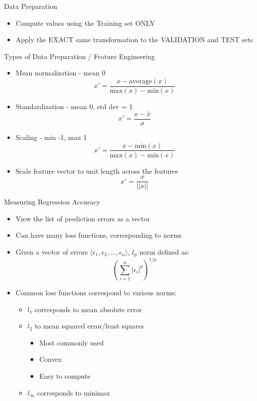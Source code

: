 \documentclass[aspectratio=169]{beamer}
\begin{document}
\begin{frame}[fragile]{Data Preparation}

\begin{itemize}
\item Compute values using the Training set ONLY
\item Apply the EXACT same  transformation to the VALIDATION and TEST sets
\end{itemize}
\end{frame}
\begin{frame}[fragile]{Types of Data Preparation / Feature Engineering}

\begin{itemize}
\item Mean normalization - mean 0
$$x' = \frac{x - \textrm{average}(x)}{\textrm{max}(x) - \textrm{min}(x)}$$
\item Standardization - mean 0, std dev = 1
$$ x' = \frac{x -\bar{x}}{\sigma}$$
\item Scaling - min -1, max 1
$$x' = \frac{x - \textrm{min}(x)}{\textrm{max}(x) - \textrm{min}(x)}$$
\item Scale feature vector to unit length across the features
$$x' = \frac{x}{||x||}$$
\end{itemize}
\end{frame}
\begin{frame}{Measuring Regression Accuracy}

\begin{itemize}
\item View the list of prediction errors as a vector
\item Can have many loss functions, corresponding to norms
\item Given a vector of errors $\langle \epsilon_1, \epsilon_2, ..., \epsilon_n \rangle$,
$l_p$ norm defined as:
$$\left(\sum_{i = 1}^n |\epsilon_i|^p \right)^{1/p}$$
\item Common loss functions correspond to various norms:
\begin{itemize}
        \item $l_1$ corresponds to mean absolute error
        \item $l_2$ to mean squared error/least squares
\begin{itemize}
\item Most commonly used
\item Convex
\item Easy to compute
\end{itemize}
        \item $l_{\infty}$ corresponds to minimax
\end{itemize}
\end{itemize}
\end{frame}
\end{document}
